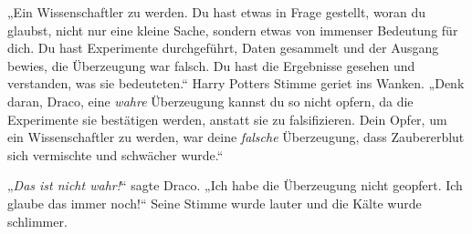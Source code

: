 „Ein Wissenschaftler zu werden. Du hast etwas in Frage gestellt, woran du glaubst, nicht nur eine kleine Sache, sondern etwas von immenser Bedeutung für dich. Du hast Experimente durchgeführt, Daten gesammelt und der Ausgang bewies, die Überzeugung war falsch. Du hast die Ergebnisse gesehen und verstanden, was sie bedeuteten.“ Harry Potters Stimme geriet ins Wanken. „Denk daran, Draco, eine \emph{wahre} Überzeugung kannst du so nicht opfern, da die Experimente sie bestätigen werden, anstatt sie zu falsifizieren. Dein Opfer, um ein Wissenschaftler zu werden, war deine \emph{falsche} Überzeugung, dass Zaubererblut sich vermischte und schwächer wurde.“

„\emph{Das ist nicht wahr!}“ sagte Draco. „Ich habe die Überzeugung nicht geopfert. Ich glaube das immer noch!“ Seine Stimme wurde lauter und die Kälte wurde schlimmer.

